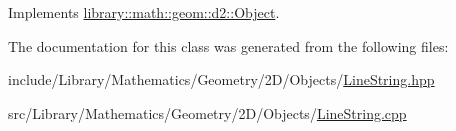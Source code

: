 Implements \hyperlink{classlibrary_1_1math_1_1geom_1_1d2_1_1_object_acdd76b3637732a249536b609dbe3f0eb}{library\+::math\+::geom\+::d2\+::\+Object}.



The documentation for this class was generated from the following files\+:\begin{DoxyCompactItemize}
\item 
include/\+Library/\+Mathematics/\+Geometry/2\+D/\+Objects/\hyperlink{2_d_2_objects_2_line_string_8hpp}{Line\+String.\+hpp}\item 
src/\+Library/\+Mathematics/\+Geometry/2\+D/\+Objects/\hyperlink{2_d_2_objects_2_line_string_8cpp}{Line\+String.\+cpp}\end{DoxyCompactItemize}
